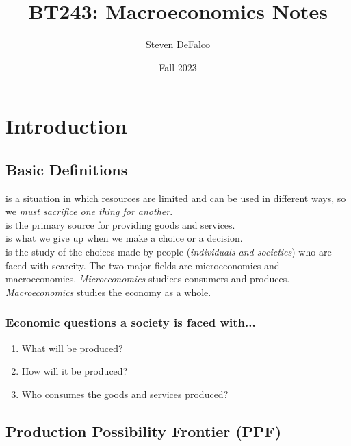 \documentclass{article}
\title{BT243: Macroeconomics Notes}
\author{Steven DeFalco}
\date{Fall 2023}
\begin{document}
\maketitle
\tableofcontents
\newpage



\section{Introduction}

\subsection{Basic Definitions}

 is a situation in which resources are limited and can be used in different ways, so we \emph{must sacrifice one thing for another}. \\ 

 is the primary source for providing goods and services. \\

 is what we give up when we make a choice or a decision. \\

 is the study of the choices made by people (\emph{individuals and societies}) who are faced with scarcity. The two major fields are microeconomics and macroeconomics. \emph{Microeconomics} studiees consumers and produces. \emph{Macroeconomics} studies the economy as a whole. \\ 

\subsubsection{Economic questions a society is faced with...}

\begin{enumerate}
  \item What will be produced? 
  \item How will it be produced?
  \item Who consumes the goods and services produced?
\end{enumerate}

\subsection{Production Possibility Frontier (PPF)}
\end{document}
